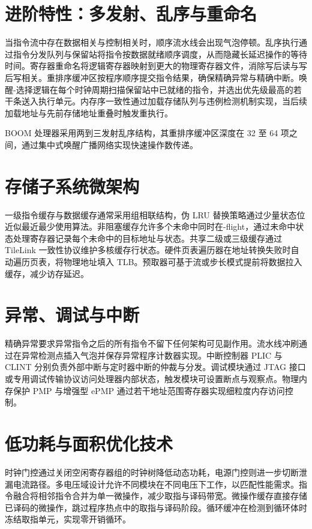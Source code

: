 \chapter{进阶特性：多发射、乱序与重命名}
当指令流中存在数据相关与控制相关时，顺序流水线会出现气泡停顿。乱序执行通过指令分发队列与保留站将指令按数据就绪顺序调度，从而隐藏长延迟操作的等待时间。寄存器重命名将逻辑寄存器映射到更大的物理寄存器文件，消除写后读与写后写相关。重排序缓冲区按程序顺序提交指令结果，确保精确异常与精确中断。唤醒-选择逻辑在每个时钟周期扫描保留站中已就绪的指令，并选出优先级最高的若干条送入执行单元。内存序一致性通过加载存储队列与违例检测机制实现，当后续加载地址与先前存储地址重叠时触发重执行。\par
BOOM 处理器采用两到三发射乱序结构，其重排序缓冲区深度在 32 至 64 项之间，通过集中式唤醒广播网络实现快速操作数传递。\par
\chapter{存储子系统微架构}
一级指令缓存与数据缓存通常采用组相联结构，伪 LRU 替换策略通过少量状态位近似最近最少使用算法。非阻塞缓存允许多个未命中同时在-flight，通过未命中状态处理寄存器记录每个未命中的目标地址与状态。共享二级或三级缓存通过 TileLink 一致性协议维护多核缓存行状态。硬件页表遍历器在地址转换失败时自动遍历页表，将物理地址填入 TLB。预取器可基于流或步长模式提前将数据拉入缓存，减少访存延迟。\par
\chapter{异常、调试与中断}
精确异常要求异常指令之后的所有指令不留下任何架构可见副作用。流水线冲刷通过在异常检测点插入气泡并保存异常程序计数器实现。中断控制器 PLIC 与 CLINT 分别负责外部中断与定时器中断的仲裁与分发。调试模块通过 JTAG 接口或专用调试传输协议访问处理器内部状态，触发模块可设置断点与观察点。物理内存保护 PMP 与增强型 ePMP 通过若干地址范围寄存器实现细粒度内存访问控制。\par
\chapter{低功耗与面积优化技术}
时钟门控通过关闭空闲寄存器组的时钟树降低动态功耗，电源门控则进一步切断泄漏电流路径。多电压域设计允许不同模块在不同电压下工作，以匹配性能需求。指令融合将相邻指令合并为单一微操作，减少取指与译码带宽。微操作缓存直接存储已译码的微操作，跳过程序热点中的取指与译码阶段。循环缓冲在检测到循环体时冻结取指单元，实现零开销循环。\par
